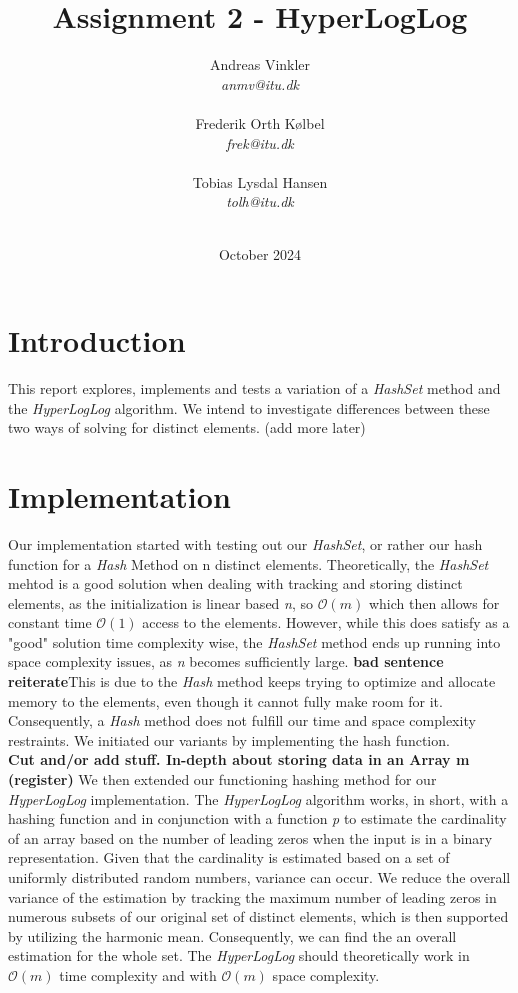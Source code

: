 \documentclass{article}
\title{Assignment 2 - HyperLogLog}
\author{
        Andreas Vinkler \\ \textit{anmv@itu.dk} \\ \\
    Frederik Orth Kølbel \\ \textit{frek@itu.dk} \\ \\
    Tobias Lysdal Hansen \\ \textit{tolh@itu.dk} \\ \\
    }
\date{October 2024}
\begin{document}
\maketitle
\newpage


\section{Introduction}
This report explores, implements and tests a variation of a \textit{HashSet} method and the \textit{HyperLogLog} algorithm. We intend to investigate differences between these two ways of solving for distinct elements.
(add more later)

\section{Implementation}
Our implementation started with testing out our \textit{HashSet}, or rather our hash function for a \textit{Hash} Method on n distinct elements. Theoretically, the \textit{HashSet} mehtod is a good solution when dealing with tracking and storing distinct elements, as the initialization is linear based \textit{n}, so $\mathcal{O}(m)$ which then allows for constant time $\mathcal{O}(1)$ access to the elements. However, while this does satisfy as a "good" solution time complexity wise, the \textit{HashSet} method ends up running into space complexity issues, as \textit{n} becomes sufficiently large. \textbf{bad sentence reiterate}This is due to the \textit{Hash} method keeps trying to optimize and allocate memory to the elements, even though it cannot fully make room for it. Consequently, a \textit{Hash} method does not fulfill our time and space complexity restraints.
We initiated our variants by implementing the hash function. 
\\

\textbf{Cut and/or add stuff. In-depth about storing data in an Array m (register)}
We then extended our functioning hashing method for our \textit{HyperLogLog} implementation. The \textit{HyperLogLog} algorithm works, in short, with a hashing function and in conjunction with a function \textit{p} to estimate the cardinality of an array based on the number of leading zeros when the input is in a binary representation. Given that the cardinality is estimated based on a set of uniformly distributed random numbers, variance can occur. We reduce the overall variance of the estimation by tracking the maximum number of leading zeros in numerous subsets of our original set of distinct elements, which is then supported by utilizing the harmonic mean. Consequently, we can find the an overall estimation for the whole set.
The \textit{HyperLogLog} should theoretically work in $\mathcal{O}(m)$ time complexity and with $\mathcal{O}(m)$ space complexity.
\\
\end{document}
